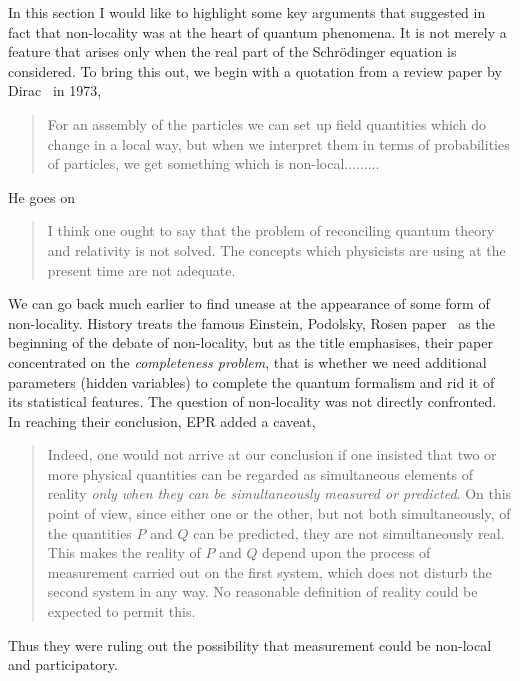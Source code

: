 \documentclass[12pt]{article}
\begin{document}
In this section I would like to highlight some key arguments that suggested in fact that non-locality was at the heart of quantum phenomena.   It is not merely a feature that arises only when the real part of the Schr\"{o}dinger equation is considered.  To bring this out,
we begin with a quotation from a review paper by Dirac~\cite{pd73} in 1973,
\begin{quote}
For an assembly of the particles we can set up field quantities which do change in a local way, but when we interpret them in terms of probabilities of particles, we get something which is non-local.........
\end{quote}
He goes on
\begin{quote}
 I think one ought to say that the problem of reconciling quantum theory and relativity is not solved.  The concepts which physicists are using at the present time are not adequate. 
 \end{quote}
 We can go back much earlier to find unease at the  appearance of some form of non-locality.  History treats the famous Einstein, Podolsky, Rosen paper~\cite{epr35} 
 as the beginning of the debate of non-locality, but as the title emphasises,  their paper concentrated on the {\em completeness problem}, that is whether we need additional parameters (hidden variables) to complete the quantum formalism and rid it of its statistical features. The question of non-locality was not directly confronted.  
 In reaching their conclusion, EPR added a caveat, 
 \begin{quote}
 Indeed, one would not arrive at our conclusion if one insisted that two or more physical quantities can be regarded as simultaneous elements of reality {\em only when they can be simultaneously measured or predicted}. On this point of view, since either one or the other,  but not both simultaneously, of the quantities $P$ and $Q$ can be predicted, they are not simultaneously real.  This makes the reality of $P$ and $Q$ depend upon the process of measurement carried out on the first system, which does not disturb the second system in any way.
  No reasonable definition of reality could be expected to permit this.
 \end{quote}
 Thus they were ruling out the possibility that measurement could be non-local and participatory.
 
\end{document}
